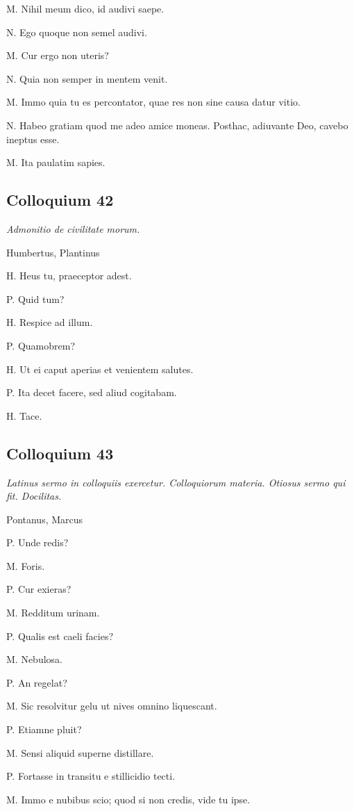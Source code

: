 \documentclass{article}
\begin{document}
M. Nihil meum dico, id audivi saepe. 

N. Ego quoque non semel audivi. 

M. Cur ergo non uteris?

N. Quia non semper in mentem venit. 

M. Immo quia tu es percontator, quae res non sine causa datur vitio. 

N. Habeo gratiam quod me adeo amice moneas. Posthac, adiuvante Deo, cavebo ineptus esse. 

M. Ita paulatim sapies.

\subsection{Colloquium 42}
\emph{Admonitio de civilitate morum.}

Humbertus, Plantinus

H. Heus tu, praeceptor adest. 

P. Quid tum?

H. Respice ad illum. 

P. Quamobrem?

H. Ut ei caput aperias et venientem salutes. 

P. Ita decet facere, sed aliud cogitabam. 

H. Tace. 

\subsection{Colloquium 43}
\emph{Latinus sermo in colloquiis exercetur. Colloquiorum materia. Otiosus sermo qui fit. Docilitas.}

Pontanus, Marcus

P. Unde redis?

M. Foris. 

P. Cur exieras?

M. Redditum urinam. 

P. Qualis est caeli facies?

M. Nebulosa. 

P. An regelat?

M. Sic resolvitur gelu ut nives omnino liquescant. 

P. Etiamne pluit?

M. Sensi aliquid superne distillare. 

P. Fortasse in transitu e stillicidio tecti. 

M. Immo e nubibus scio; quod si non credis, vide tu ipse. 
\end{document}
